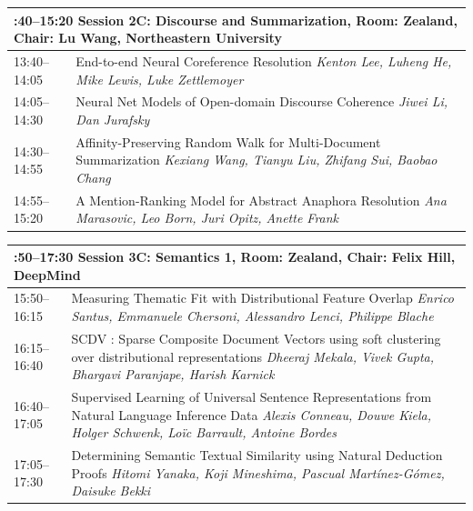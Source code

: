 \documentclass{book}
\renewcommand{\large}{\fontsize{36}{40}\selectfont}
\begin{document}
\begin{tabular}{p{3in}p{16in}}
  \multicolumn{2}{p{\textwidth}}{\bfseries\large 13:40--15:20 Session 2C: Discourse and Summarization, Room:  Zealand, Chair:  Lu Wang, Northeastern University} \\\hline

    
    13:40--14:05
    &	End-to-end Neural Coreference Resolution \newline 
    {\itshape Kenton Lee, Luheng He, Mike Lewis, Luke Zettlemoyer} \\
    
    14:05--14:30
    &	Neural Net Models of Open-domain Discourse Coherence \newline 
    {\itshape Jiwei Li, Dan Jurafsky} \\
    
    14:30--14:55
    &	Affinity-Preserving Random Walk for Multi-Document Summarization \newline 
    {\itshape Kexiang Wang, Tianyu Liu, Zhifang Sui, Baobao Chang} \\
    
    14:55--15:20
    &	A Mention-Ranking Model for Abstract Anaphora Resolution \newline 
    {\itshape Ana Marasovic, Leo Born, Juri Opitz, Anette Frank} \\
    
\end{tabular}

\begin{tabular}{p{3in}p{16in}}
  \multicolumn{2}{p{\textwidth}}{\bfseries\large 15:50--17:30 Session 3C: Semantics 1, Room:  Zealand, Chair:  Felix Hill, DeepMind} \\\hline

    
    15:50--16:15
    &	Measuring Thematic Fit with Distributional Feature Overlap \newline 
    {\itshape Enrico Santus, Emmanuele Chersoni, Alessandro Lenci, Philippe Blache} \\
    
    16:15--16:40
    &	SCDV : Sparse Composite Document Vectors using soft clustering over distributional representations \newline 
    {\itshape Dheeraj Mekala, Vivek Gupta, Bhargavi Paranjape, Harish Karnick} \\
    
    16:40--17:05
    &	Supervised Learning of Universal Sentence Representations from Natural Language Inference Data \newline 
    {\itshape Alexis Conneau, Douwe Kiela, Holger Schwenk, Loïc Barrault, Antoine Bordes} \\
    
    17:05--17:30
    &	Determining Semantic Textual Similarity using Natural Deduction Proofs \newline 
    {\itshape Hitomi Yanaka, Koji Mineshima, Pascual Martínez-Gómez, Daisuke Bekki} \\
    
\end{tabular}
\end{document}
